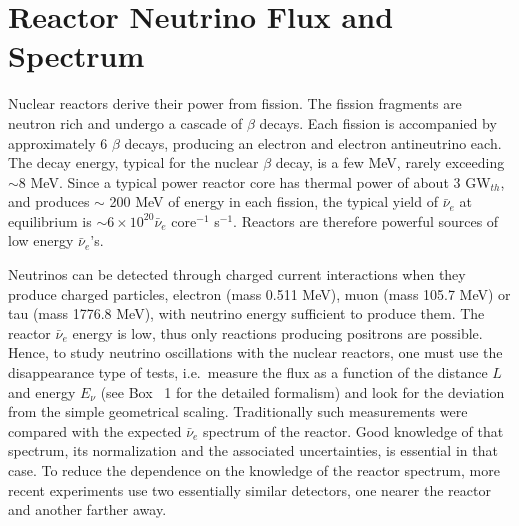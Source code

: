\documentclass[aps,twocolumn,preprintnumbers,amsmath,superscriptaddress,amssymb,floats,nofootinbib]{revtex4-1}
\begin{document}
\section{Reactor Neutrino Flux and Spectrum} 
\label{sec:flux}

Nuclear reactors derive their power from fission. The fission fragments are neutron rich and undergo a cascade of $\beta$ decays. 
Each fission is accompanied by approximately 6 $\beta$ decays, producing an electron and electron antineutrino each. 
The decay energy, typical for the nuclear $\beta$ decay, is a few MeV, rarely exceeding $\sim$8 MeV. 
Since a typical power reactor core has thermal power of about 3 GW$_{th}$, and produces
$\sim$ 200 MeV of energy in each fission, the typical yield of $\bar{\nu}_e$ at equilibrium is $\sim 6 \times 10^{20} \bar{\nu}_e$ core$^{-1}$ s$^{-1}$.   
Reactors are therefore powerful sources of low energy $\bar{\nu}_e$'s.

Neutrinos can be detected through charged current interactions when they produce charged particles, electron (mass 0.511 MeV),
muon (mass 105.7 MeV) or tau (mass 1776.8 MeV), with neutrino energy sufficient to
produce them. The reactor $\bar{\nu}_e$ energy is low, thus only reactions producing positrons are possible. Hence, to study neutrino oscillations with
the nuclear reactors, one must use the disappearance type of tests, i.e.~measure the flux as a function of the distance $L$ and energy $E_{\nu}$ (see Box ~1 for the detailed formalism) and
look for the deviation from the simple geometrical scaling. Traditionally such measurements were compared with the expected  $\bar{\nu}_e$ spectrum
of the reactor. Good knowledge of that spectrum, its normalization and the associated uncertainties, is essential in that case.  
To reduce the dependence on the knowledge of the reactor spectrum, more recent experiments
\cite{Dayabay,Reno} use two essentially similar detectors, one nearer the reactor and another farther away.
\end{document}
